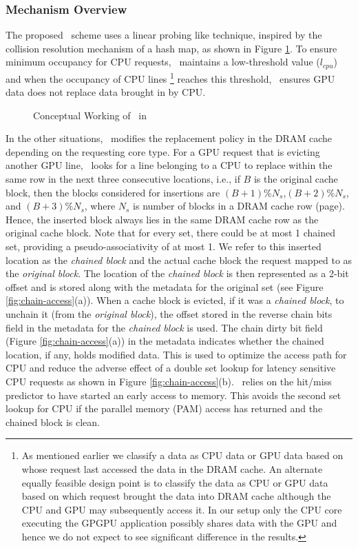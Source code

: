 \subsubsection{Mechanism Overview}
\par The proposed \chaining\ scheme uses a linear probing \cite{knuth-linear-probing} like technique, inspired by the collision resolution mechanism of a hash map, as shown in Figure \ref{fig:chaining-concept}.
To ensure minimum occupancy for CPU requests, \chaining\ maintains a low-threshold value (\textit{$l_{cpu}$}) and when the occupancy of CPU lines
\footnote{As mentioned earlier we classify a data as CPU data or GPU data based on whose request last accessed the data in the DRAM cache. An alternate equally feasible design point is to classify the data as CPU or GPU data based on which request brought the data into DRAM cache although the CPU and GPU may subsequently access it. In our setup only the CPU core executing the GPGPU application possibly shares data with the GPU and hence we do not expect to see significant difference in the results.} 
reaches this threshold, \chaining\ ensures GPU data does not replace data brought in by CPU. 

\begin{figure}
	\centering
	\def\svgwidth{0.45\linewidth}
	
	\caption{Conceptual Working of \chaining\ in \cachename}
	\label{fig:chaining-concept}
\end{figure}

In the other situations, \cachename\ modifies the replacement policy in the DRAM cache depending on the requesting core type. For a GPU request that is evicting another GPU line, \cachename\ looks for a line belonging to a CPU to replace within the same row in the next three consecutive locations,
i.e., if $B$ is the original cache block, then the blocks considered for insertions are $(B+1)\%N_s$,$(B+2)\%N_s$, and $(B+3)\%N_s$, where $N_s$ is number of blocks in a DRAM cache row (page). Hence, the inserted block always lies in the same DRAM cache row as the original cache block. Note that for every set, there could be at most 1 chained set, providing a pseudo-associativity of at most 1.  
We refer to this inserted location as the \textit{chained block} and the actual cache block the request mapped to as the \textit{original block}. The location of the \textit{chained block} is then represented as a 2-bit offset and is stored along with the metadata for the original set (see Figure \ref{fig:chain-access}(a)). When a cache block is evicted, if it was a \textit{chained block}, to unchain it (from the \textit{original block}), the offset stored in the reverse chain bits field in the metadata for the \textit{chained block} is used.  
The chain dirty bit field (Figure \ref{fig:chain-access}(a)) in the metadata indicates whether the chained location, if any, holds modified data. This is used to optimize the access path for CPU and reduce the adverse effect of a double set lookup for latency sensitive CPU requests as shown in Figure \ref{fig:chain-access}(b). \chaining\ relies on the hit/miss predictor to have started an early access to memory. This avoids the second set lookup for CPU if the parallel memory (PAM) access has returned and the chained block is clean. 


